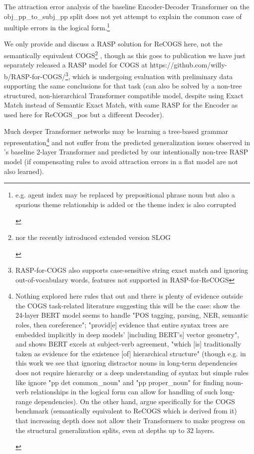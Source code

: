 \documentclass[11pt]{article}
\begin{document}
The attraction error analysis of the \cite{Wu2023} baseline Encoder-Decoder Transformer on the obj\_pp\_to\_subj\_pp split does not yet attempt to explain the common case of multiple errors in the logical form.\footnote{\begin{footnotesize}e.g. agent index may be replaced by prepositional phrase noun but also a spurious theme relationship is added or the theme index is also corrupted\end{footnotesize}}

We only provide and discuss a RASP solution for ReCOGS \cite{Wu2023} here, not the semantically equivalent COGS\footnote{\begin{footnotesize}nor the recently introduced extended version SLOG \cite{li2023slogstructuralgeneralizationbenchmark}\end{footnotesize}} \cite{KimLinzen2020}, though as this goes to publication we have just separately released a RASP model for COGS at https://github.com/willy-b/RASP-for-COGS/\footnote{RASP-for-COGS also supports case-sensitive string exact match and ignoring out-of-vocabulary words, features not supported in RASP-for-ReCOGS}, which is undergoing evaluation with preliminary data supporting the same conclusions for that task (can also be solved by a non-tree structured, non-hierarchical Transformer compatible model, despite using Exact Match instead of Semantic Exact Match, with same RASP for the Encoder as used here for ReCOGS\_pos but a different Decoder).

Much deeper Transformer networks may be learning a tree-based grammar representation\footnote{\begin{footnotesize}Nothing explored here rules that out and there is plenty of evidence outside the COGS task-related literature suggesting this will be the case: \cite{tenney2019bertrediscoversclassicalnlp} show the 24-layer BERT model seems to handle "POS tagging, parsing, NER, semantic roles, then coreference"; \cite{hewitt-manning-2019-structural} "provid[e] evidence that entire syntax trees are embedded implicitly in deep models’ [including BERT's] vector geometry", and \cite{goldberg2019assessingbertssyntacticabilities} shows BERT excels at subject-verb agreement, "which [is] traditionally taken as evidence for
the existence [of] hierarchical structure" (though e.g. in this work we see that ignoring distractor nouns in long-term dependencies does not require hierarchy or a deep understanding of syntax but simple rules like ignore "pp det common\_noun" and "pp proper\_noun" for finding noun-verb relationships in the logical form can allow for handling of such long-range dependencies). On the other hand, \cite{petty2024impactdepthcompositionalgeneralization} argue specifically for the COGS benchmark (semantically equivalent to ReCOGS which is derived from it) that increasing depth does not allow their Transformers to make progress on the structural generalization splits, even at depths up to 32 layers.
\end{footnotesize}
} and not suffer from the predicted generalization issues observed in \cite{Wu2023}'s baseline 2-layer Transformer and predicted by our intentionally non-tree RASP model (if compensating rules to avoid attraction errors in a flat model are not also learned).
\end{document}
